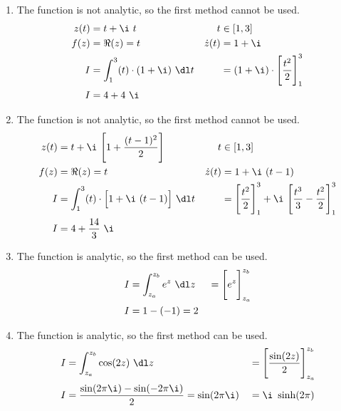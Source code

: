 \begin{enumerate}
    \item The function is \textcolor{y_p}{not analytic}, so the first method cannot be
          used.
          \begin{align}
              z(t)       & = t + \i\ t                                      &
              t          & \in [1,3]                                          \\
              f(z)       & = \Re{(z)} = t                                   &
              \dot{z}(t) & = 1 + \i                                           \\
              I          & = \int_{1}^{3} (t) \cdot (1 + \i)\ \dl t         &
                         & = (1 + \i) \cdot \Bigg[ \frac{t^2}{2} \Bigg]_1^3   \\
              I          & = 4 + 4\ \i
          \end{align}

    \item The function is \textcolor{y_p}{not analytic}, so the first method cannot be
          used.
          \begin{align}
              z(t)       & = t + \i\ \Bigg[1 + \frac{(t - 1)^2}{2}\Bigg]             &
              t          & \in [1,3]                                                   \\
              f(z)       & = \Re{(z)} = t                                            &
              \dot{z}(t) & = 1 + \i\ (t-1)                                             \\
              I          & = \int_{1}^{3} (t) \cdot \Big[1 + \i\ (t - 1)\Big]\ \dl t &
                         & = \Bigg[ \frac{t^2}{2} \Bigg]_1^3
              + \i\ \Bigg[ \frac{t^3}{3} - \frac{t^2}{2} \Bigg]_1^3                    \\
              I          & = 4 + \frac{14}{3}\ \i
          \end{align}

    \item The function is \textcolor{y_h}{analytic}, so the first method can be used.
          \begin{align}
              I & = \int_{z_a}^{z_b} e^z \ \dl z  &
                & = \Bigg[ e^z \Bigg]_{z_a}^{z_b}   \\
              I & = 1 - (-1) = 2
          \end{align}

    \item The function is \textcolor{y_h}{analytic}, so the first method can be used.
          \begin{align}
              I & = \int_{z_a}^{z_b} \cos(2z) \ \dl z                      &
                & = \Bigg[ \frac{\sin(2z)}{2} \Bigg]_{z_a}^{z_b}             \\
              I & = \frac{\sin(2\pi\i) - \sin(-2\pi\i)}{2} = \sin(2\pi \i) &
                & = \i\ \sinh(2\pi)
          \end{align}


\end{enumerate}
